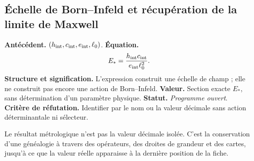 \subsection*{Échelle de Born--Infeld et récupération de la limite de Maxwell}
\textbf{Antécédent.} \((h_{\rm int},c_{\rm int},e_{\rm int},\ell_0)\).
\textbf{Équation.}
\begin{equation}
E_*=\frac{h_{\rm int}c_{\rm int}}{e_{\rm int}\ell_0^2}.
\label{eq:atlas-born}
\end{equation}
\textbf{Structure et signification.} L'expression construit une échelle de
champ ; elle ne construit pas encore une action de Born--Infeld.
\textbf{Valeur.} Section exacte \(E_*\), sans détermination d'un
paramètre physique.
\textbf{Statut.} \emph{Programme ouvert}. \textbf{Critère de réfutation.} Identifier
par le nom ou la valeur décimale sans action déterminantale ni sélecteur.

\begin{proposition}
Le résultat métrologique n'est pas la valeur décimale isolée. C'est la conservation
d'une généalogie à travers des opérateurs, des droites de grandeur et des cartes, jusqu'à
ce que la valeur réelle apparaisse à la dernière position de la fiche.
\end{proposition}
